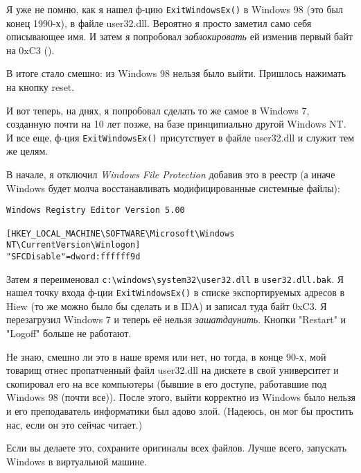 
Я уже не помню, как я нашел ф-цию \verb|ExitWindowsEx()| в Windows 98 (это был конец 1990-х), в файле user32.dll.
Вероятно я просто заметил само себя описывающее имя.
И затем я попробовал \emph{заблокировать} ей изменив первый байт на 0xC3 ().

В итоге стало смешно: из Windows 98 нельзя было выйти.
Пришлось нажимать на кнопку reset.

И вот теперь, на днях, я попробовал сделать то же самое в Windows 7, созданную почти на 10 лет позже, на базе принципиально другой
Windows NT.
И все еще, ф-ция \verb|ExitWindowsEx()| присутствует в файле user32.dll и служит тем же целям.

В начале, я отключил \emph{Windows File Protection} добавив это в реестр
(а иначе Windows будет молча восстанавливать модифицированные системные файлы):

\begin{lstlisting}
Windows Registry Editor Version 5.00

[HKEY_LOCAL_MACHINE\SOFTWARE\Microsoft\Windows NT\CurrentVersion\Winlogon]
"SFCDisable"=dword:ffffff9d
\end{lstlisting}

Затем я переименовал \verb|c:\windows\system32\user32.dll| в \verb|user32.dll.bak|.
Я нашел точку входа ф-ции \verb|ExitWindowsEx()| в списке экспортируемых адресов в Hiew (то же можно было бы сделать и в IDA) и записал туда байт 0xC3.
Я перезагрузил Windows 7 и теперь её нельзя \emph{зашатдаунить}.
Кнопки "Restart" и "Logoff" больше не работают.

Не знаю, смешно ли это в наше время или нет, но тогда, в конце 90-х, мой товарищ отнес пропатченный файл user32.dll
на дискете в свой университет и скопировал его на все компьютеры
(бывшие в его доступе, работавшие под Windows 98 (почти все)).
После этого, выйти корректно из Windows было нельзя и его преподаватель информатики был адово злой.
(Надеюсь, он мог бы простить нас, если он это сейчас читает.)

Если вы делаете это, сохраните оригиналы всех файлов.
Лучше всего, запускать Windows в виртуальной машине.

